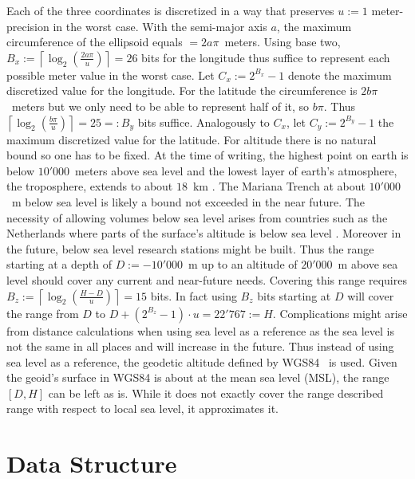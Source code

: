 \documentclass[10pt,conference,compsocconf]{IEEEtran}
\begin{document}
Each of the three coordinates is discretized in a way that preserves $u := 1$ meter-precision in the worst case.
With the semi-major axis $a$, the maximum circumference of the ellipsoid equals $=2 a \pi$~meters.
Using base two, $B_{x}:= \left\lceil \log_2(\frac{2 a \pi}{u}) \right\rceil = 26$ bits for the longitude thus suffice to represent each possible meter value in the worst case.
Let $C_{x} := 2^{B_{x}} - 1$ denote the maximum discretized value for the longitude.
For the latitude the circumference is $2 b \pi$~meters but we only need to be able to represent half of it, so $b \pi$.
Thus $\left\lceil\log_2(\frac{b \pi}{u})\right\rceil = 25 =: B_{y}$ bits suffice.
Analogously to $C_{x}$, let $C_y := 2^{B_{y}} - 1$ the maximum discretized value for the latitude.
For altitude there is no natural bound so one has to be fixed.
At the time of writing, the highest point on earth is below $10'000$~meters above sea level \cite{us_department_of_commerce_what_nodate} and the lowest layer of earth's atmosphere, the troposphere, extends to about $18$~km \cite{dhaka_chapter_2023}.
The Mariana Trench at about $10'000$~m below sea level \cite{gardner_so_2014} is likely a bound not exceeded in the near future.
The necessity of allowing volumes below sea level arises from countries such as the Netherlands where parts of the surface's altitude is below sea level \cite{kabat_climate_2005} .
Moreover in the future, below sea level research stations might be built.
Thus the range starting at a depth of $D:=-10'000$~m up to an altitude of $20'000$~m above sea level should cover any current and near-future needs.
Covering this range requires $B_{z} := \left\lceil \log_2(\frac{H - D}{u}) \right\rceil = 15$ bits.
In fact using $B_z$ bits starting at $D$ will cover the range from $D$ to $D + (2^{B_{z}} - 1) \cdot u = 22'767 := H$.
Complications might arise from distance calculations when using sea level as a reference as the sea level is not the same in all places and will increase in the future.
Thus instead of using sea level as a reference, the geodetic altitude defined by WGS84~\cite{noauthor_nga_nodate} is used.
Given the geoid's surface in WGS84 is about at the mean sea level (MSL), the range $[D, H]$ can be left as is.
While it does not exactly cover the range described range with respect to local sea level, it approximates it.

\section{Data Structure}
\label{sec:data-structure}
\end{document}

